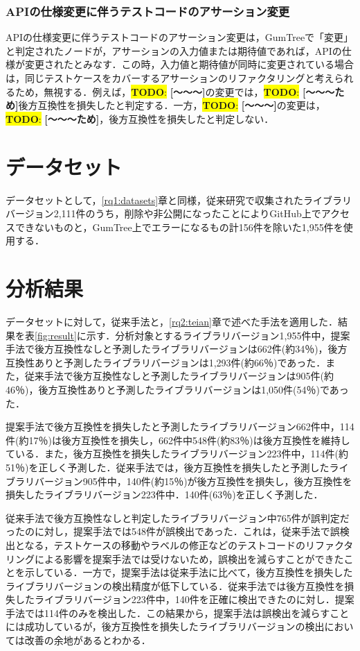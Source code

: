 \documentclass[11pt,dvipdfmx]{jreport}
\newcommand{\todo}[1]{\colorbox{yellow}{{\bf TODO}:}{\color{red} {\textbf{[#1]}}}}
\begin{document}
\subsubsection{APIの仕様変更に伴うテストコードのアサーション変更}
APIの仕様変更に伴うテストコードのアサーション変更は，GumTreeで「変更」と判定されたノードが，アサーションの入力値または期待値であれば，APIの仕様が変更されたとみなす．この時，入力値と期待値が同時に変更されている場合は，同じテストケースをカバーするアサーションのリファクタリングと考えられるため，無視する．例えば，\todo{〜〜〜}の変更では，\todo{〜〜〜ため}後方互換性を損失したと判定する．一方，\todo{〜〜〜}の変更は，\todo{〜〜〜ため}，後方互換性を損失したと判定しない．

\section{データセット}
データセットとして，\ref{rq1:datasets}章と同様，従来研究\cite{matsuda}で収集されたライブラリバージョン2,111件のうち，削除や非公開になったことによりGitHub上でアクセスできないものと，GumTree上でエラーになるもの計156件を除いた1,955件を使用する．

\section{分析結果}

データセットに対して，従来手法と，\ref{rq2:teian}章で述べた手法を適用した．結果を表\ref{fig:result}に示す．分析対象とするライブラリバージョン1,955件中，提案手法で後方互換性なしと予測したライブラリバージョンは662件(約34％)，後方互換性ありと予測したライブラリバージョンは1,293件(約66％)であった．また，従来手法で後方互換性なしと予測したライブラリバージョンは905件(約46％)，後方互換性ありと予測したライブラリバージョンは1,050件(54％)であった．

提案手法で後方互換性を損失したと予測したライブラリバージョン662件中，114件(約17％)は後方互換性を損失し，662件中548件(約83％)は後方互換性を維持している．また，後方互換性を損失したライブラリバージョン223件中，114件(約51％)を正しく予測した．従来手法では，後方互換性を損失したと予測したライブラリバージョン905件中，140件(約15％)が後方互換性を損失し，後方互換性を損失したライブラリバージョン223件中．140件(63％)を正しく予測した．

従来手法で後方互換性なしと判定したライブラリバージョン中765件が誤判定だったのに対し，提案手法では548件が誤検出であった．これは，従来手法で誤検出となる，テストケースの移動やラベルの修正などのテストコードのリファクタリングによる影響を提案手法では受けないため，誤検出を減らすことができたことを示している．一方で，提案手法は従来手法に比べて，後方互換性を損失したライブラリバージョンの検出精度が低下している．従来手法では後方互換性を損失したライブラリバージョン223件中，140件を正確に検出できたのに対し．提案手法では114件のみを検出した．この結果から，提案手法は誤検出を減らすことには成功しているが，後方互換性を損失したライブラリバージョンの検出においては改善の余地があるとわかる．
\end{document}
